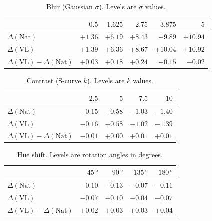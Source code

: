 \documentclass{article}
\begin{document}
\begin{table}[h]
  \centering
  \small
  \begin{tabular}{l r r r r r}
    \toprule
    & $0.5$ & $1.625$ & $2.75$ & $3.875$ & $5$ \\
    \midrule
    $\Delta(\mathrm{Nat})$ & $+1.36$ & $+6.19$ & $+8.43$ & $+9.89$ & $+10.94$ \\
    $\Delta(\mathrm{VL})$ & $+1.39$ & $+6.36$ & $+8.67$ & $+10.04$ & $+10.92$ \\
    $\Delta(\mathrm{VL}) - \Delta(\mathrm{Nat})$ & $+0.03$ & $+0.18$ & $+0.24$ & $+0.15$ & $-0.02$ \\
    \bottomrule
  \end{tabular}
  \caption{Blur (Gaussian $\sigma$). Levels are $\sigma$ values.}
  \label{tab:inv_blur}
\end{table}

\begin{table}[h]
  \centering
  \small
  \begin{tabular}{l r r r r}
    \toprule
    & $2.5$ & $5$ & $7.5$ & $10$ \\
    \midrule
    $\Delta(\mathrm{Nat})$ & $-0.15$ & $-0.58$ & $-1.03$ & $-1.40$ \\
    $\Delta(\mathrm{VL})$ & $-0.16$ & $-0.58$ & $-1.02$ & $-1.39$ \\
    $\Delta(\mathrm{VL}) - \Delta(\mathrm{Nat})$ & $-0.01$ & $+0.00$ & $+0.01$ & $+0.01$ \\
    \bottomrule
  \end{tabular}
  \caption{Contrast (S-curve $k$). Levels are $k$ values.}
  \label{tab:inv_contrast}
\end{table}

\begin{table}[h]
  \centering
  \small
  \begin{tabular}{l r r r r}
    \toprule
    & $45\,\mathrm{°}$ & $90\,\mathrm{°}$ & $135\,\mathrm{°}$ & $180\,\mathrm{°}$ \\
    \midrule
    $\Delta(\mathrm{Nat})$ & $-0.10$ & $-0.13$ & $-0.07$ & $-0.11$ \\
    $\Delta(\mathrm{VL})$ & $-0.07$ & $-0.10$ & $-0.04$ & $-0.07$ \\
    $\Delta(\mathrm{VL}) - \Delta(\mathrm{Nat})$ & $+0.02$ & $+0.03$ & $+0.03$ & $+0.04$ \\
    \bottomrule
  \end{tabular}
  \caption{Hue shift. Levels are rotation angles in degrees.}
  \label{tab:inv_hue}
\end{table}
\end{document}
